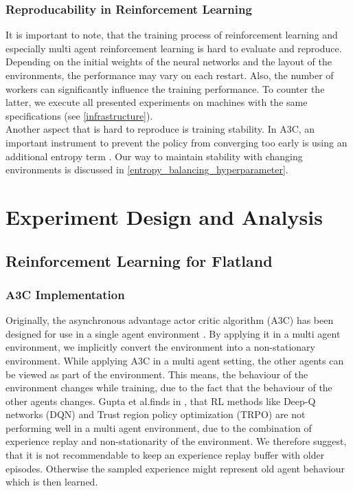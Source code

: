 \subsection*{Reproducability in Reinforcement Learning}\label{reproducability}
It is important to note, that the training process of reinforcement learning and especially multi agent reinforcement learning is hard to evaluate and reproduce. Depending on the initial weights of the neural networks and the layout of the environments, the performance may vary on each restart. Also, the number of workers can 
significantly influence the training performance. To counter the latter, we execute all presented experiments on machines with the same specifications (see \autoref{infrastructure}).\\
Another aspect that is hard to reproduce is training stability. In A3C, an important instrument to prevent the policy from converging too early is using an additional entropy term \cite{a3c}. Our way to maintain stability with changing environments is discussed in \autoref{entropy_balancing_hyperparameter}.
\chapter{Experiment Design and Analysis}\label{chap.experiment}
\section{Reinforcement Learning for Flatland}
\subsection*{A3C Implementation}\label{a3c_implementation}
Originally, the asynchronous advantage actor critic algorithm (A3C) has been designed for use in a single agent environment \cite{a3c}.
By applying it in a multi agent environment, we implicitly convert the environment into a non-stationary environment.
While applying A3C in a multi agent setting, the other agents can be viewed as part of the environment. This means, the behaviour of the environment changes while training, due to the fact that the behaviour of the other agents changes.
Gupta et al.finds in \cite{multiagent_comp_a3c_dqn_etc}, that RL methods like Deep-Q networks (DQN) and Trust region policy optimization (TRPO) are not performing well in a multi agent environment, due to the combination of experience replay and non-stationarity of the environment. We therefore suggest, that it is not recommendable to keep an experience replay buffer with older episodes. Otherwise the sampled experience might represent old agent behaviour which is then learned.
